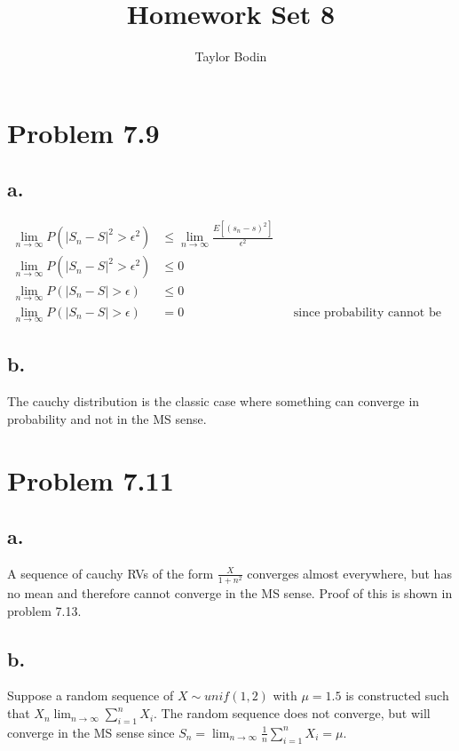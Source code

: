 \documentclass[12pt]{article}
\begin{document}
\title{Homework Set 8}
\author{Taylor Bodin}
\maketitle

\section{Problem 7.9}
\subsection{a.}
\begin{align*}
  \lim_{n\to\infty} P\left( |S_n-S|^2 > \epsilon^2 \right) &\leq \lim_{n\to\infty} \frac{E[(s_n-s)^2]}{\epsilon^2} \\
  \lim_{n\to\infty} P\left( |S_n-S|^2 > \epsilon^2 \right) &\leq 0 \\
  \lim_{n\to\infty} P\left( |S_n-S| > \epsilon \right) &\leq 0 \\
  \lim_{n\to\infty} P\left( |S_n-S| > \epsilon \right) &= 0 & & \textrm{since probability cannot be negative.}
\end{align*}

\subsection{b.}
The cauchy distribution is the classic case where something can converge in probability and not in the MS sense. 

\section{Problem 7.11}
\subsection{a.}
A sequence of cauchy RVs of the form $\frac{X}{1+n^2}$ converges almost everywhere, but has no mean and therefore
cannot converge in the MS sense. Proof of this is shown in problem 7.13.

\subsection{b.}
Suppose a random sequence of $X\sim unif(1,2)$ with $\mu = 1.5$ is constructed such that 
$X_n \lim_{n\to\infty} \sum_{i=1}^n X_i$. The random sequence does not converge, but will
converge in the MS sense since $S_n = \lim_{n\to\infty} \frac{1}{n} \sum_{i=1}^n X_i = \mu$. 
\end{document}
